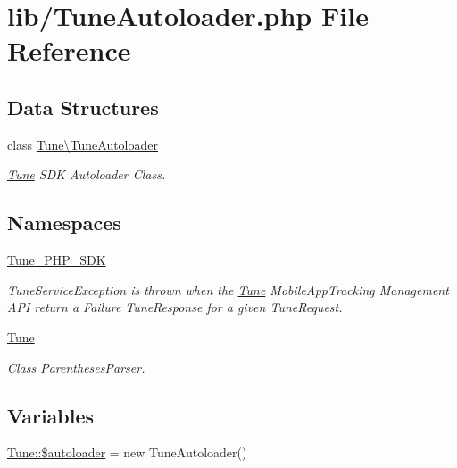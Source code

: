 \hypertarget{TuneAutoloader_8php}{\section{lib/\-Tune\-Autoloader.php File Reference}
\label{TuneAutoloader_8php}
}
\subsection*{Data Structures}
\begin{DoxyCompactItemize}
\item 
class \hyperlink{classTune_1_1TuneAutoloader}{Tune\textbackslash{}\-Tune\-Autoloader}
\begin{DoxyCompactList}\small\item\em \hyperlink{namespaceTune}{Tune} S\-D\-K Autoloader Class. \end{DoxyCompactList}\end{DoxyCompactItemize}
\subsection*{Namespaces}
\begin{DoxyCompactItemize}
\item 
\hyperlink{namespaceTune__PHP__SDK}{Tune\-\_\-\-P\-H\-P\-\_\-\-S\-D\-K}
\begin{DoxyCompactList}\small\item\em Tune\-Service\-Exception is thrown when the \hyperlink{namespaceTune}{Tune} Mobile\-App\-Tracking Management A\-P\-I return a Failure Tune\-Response for a given Tune\-Request. \end{DoxyCompactList}\item 
\hyperlink{namespaceTune}{Tune}
\begin{DoxyCompactList}\small\item\em Class Parentheses\-Parser. \end{DoxyCompactList}\end{DoxyCompactItemize}
\subsection*{Variables}
\begin{DoxyCompactItemize}
\item 
\hyperlink{namespaceTune_a45833c84db9823c05fccd9d72c991286}{Tune\-::\$autoloader} = new Tune\-Autoloader()
\end{DoxyCompactItemize}
